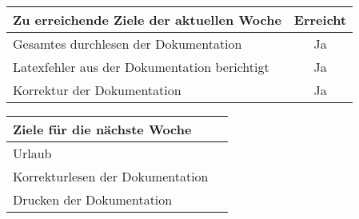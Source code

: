 \begin{tabularx}{\textwidth}{Xc}
    \arrayrulecolor{OliveGreen}
    \toprule
    {\bfseries Zu erreichende Ziele der aktuellen Woche} & {\bfseries Erreicht} \\
    \midrule[2pt]
    Gesamtes durchlesen der Dokumentation                   &Ja              \\
    \rowcolor{OliveGreen!15}
    Latexfehler aus der Dokumentation berichtigt            &Ja              \\
    \rowcolor{White}
    Korrektur der Dokumentation                             &Ja              \\
    \bottomrule[2pt]
\end{tabularx}
%
\vspace{1cm}
%
\begin{tabularx}{\textwidth}{Xc}
    \arrayrulecolor{OliveGreen}
    \toprule
    {\bfseries Ziele für die nächste Woche}        &                         \\
    \midrule[2pt]
    Urlaub                     &                                             \\
    \rowcolor{OliveGreen!15}
    Korrekturlesen der Dokumentation                      &                  \\
    \rowcolor{White}
    Drucken der Dokumentation                      &                         \\
\end{tabularx}
